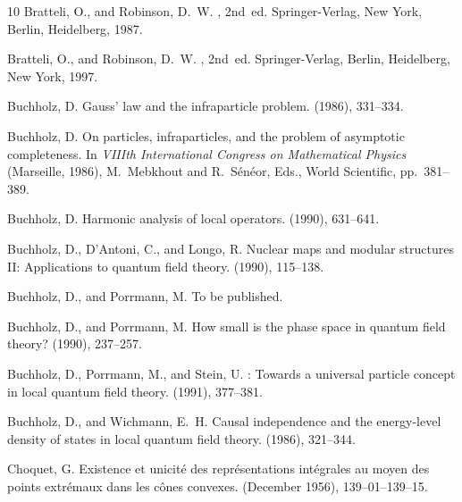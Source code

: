 \documentclass[11pt,twoside,openright]{report}
\theoremstyle{definition}
\theoremstyle{plain}
\theoremstyle{remark}
\theoremstyle{assumption}
\begin{document}
\begin{thebibliography}{10}
{\sc Bratteli, O., and Robinson, D.~W.}
, 2nd~ed.
\newblock Springer-Verlag, New York, Berlin, Heidelberg, 1987.

{\sc Bratteli, O., and Robinson, D.~W.}
, 2nd~ed.
\newblock Springer-Verlag, Berlin, Heidelberg, New York, 1997.

{\sc Buchholz, D.}
\newblock Gauss' law and the infraparticle problem.
 (1986), 331--334.

{\sc Buchholz, D.}
\newblock On particles, infraparticles, and the problem of asymptotic
  completeness.
\newblock In {\em VIIIth International Congress on Mathematical Physics\/}
  (Marseille, 1986), M.~Mebkhout and R.~S\'{e}n\'{e}or, Eds., World Scientific,
  pp.~381--389.

{\sc Buchholz, D.}
\newblock Harmonic analysis of local operators.
 (1990), 631--641.

{\sc Buchholz, D., D'Antoni, C., and Longo, R.}
\newblock Nuclear maps and modular structures {II}: Applications to quantum
  field theory.
 (1990), 115--138.

{\sc Buchholz, D., and Porrmann, M.}
\newblock To be published.

{\sc Buchholz, D., and Porrmann, M.}
\newblock How small is the phase space in quantum field theory?
 (1990),
  237--257.

{\sc Buchholz, D., Porrmann, M., and Stein, U.}
: Towards a universal particle concept in local
  quantum field theory.
 (1991), 377--381.

{\sc Buchholz, D., and Wichmann, E.~H.}
\newblock Causal independence and the energy-level density of states in local
  quantum field theory.
 (1986), 321--344.

{\sc Choquet, G.}
\newblock Existence et unicit\'{e} des repr\'{e}sentations int\'{e}grales au
  moyen des points extr\'{e}maux dans les c\^{o}nes convexes.
 (December 1956), 139--01--139--15.


\end{thebibliography}
\end{document}
